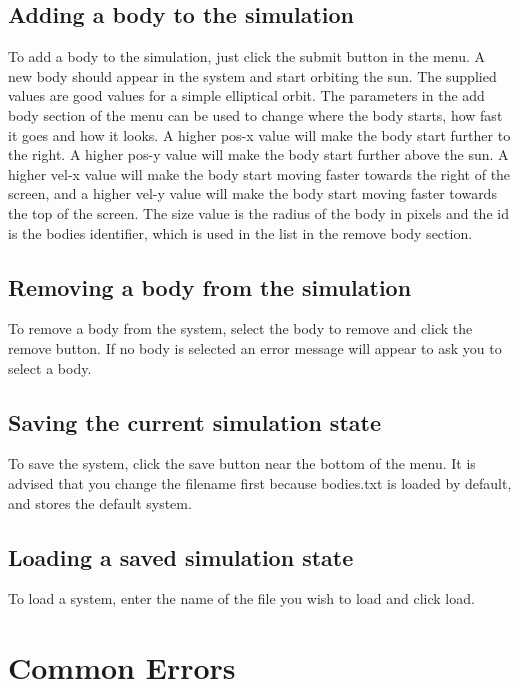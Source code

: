 \documentclass[a4paper,11pt,titlepage]{article}
\begin{document}
\subsection{Adding a body to the simulation}
To add a body to the simulation, just click the submit button in the menu. A new
body should appear in the system and start  orbiting the sun. The supplied
values are good values for a simple elliptical orbit. The parameters in the add
body section of the menu can be used to change where the body starts, how fast
it goes and how it looks. A higher pos-x value will make the body start further
to the right. A higher pos-y value will make the body start further above the
sun. A higher vel-x value will make the body start moving faster towards the
right of the screen, and a higher vel-y value will make the body start moving
faster towards the top of the screen. The size value is the radius of the body
in pixels and the id is the bodies identifier, which is used in the list in the
remove body section.

\subsection{Removing a body from the simulation}
To remove a body from the system, select the body to remove and click the remove
button. If no body is selected an error message will appear to ask you to select
a body.

\subsection{Saving the current simulation state}
To save the system, click the save button near the bottom of the menu. It is
advised that you change the filename first because bodies.txt is loaded by
default, and stores the default system.

\subsection{Loading a saved simulation state}
To load a system, enter the name of the file you wish to load and click load.

\section{Common Errors}
\end{document}
